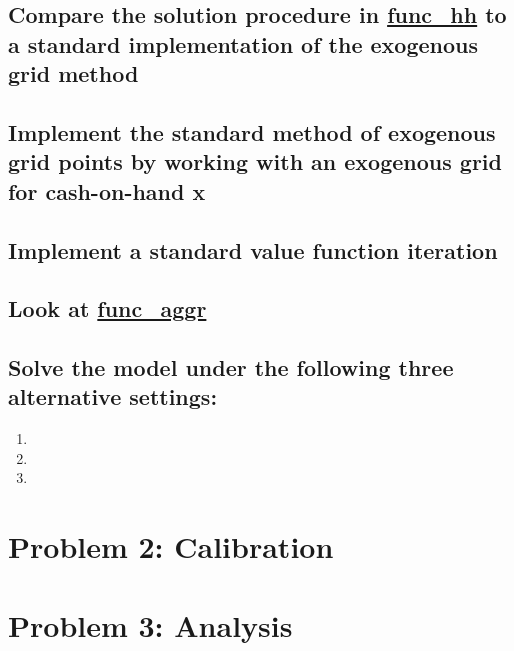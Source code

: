 \documentclass[12pt,a4paper]{article}
\newcommand\purl[1]{\protect\url{#1}} %
\begin{document}
\subsection*{Compare the solution procedure in \purl{func_hh} to a standard implementation of the exogenous grid method}

\subsection*{Implement the standard method of exogenous grid points by working with an exogenous grid for cash-on-hand x}

\subsection*{Implement a standard value function iteration}

\subsection*{Look at \purl{func_aggr}}

\subsection*{Solve the model under the following three alternative settings:}

\begin{enumerate}
\item
\item
\item
\end{enumerate}

\section*{Problem 2: Calibration}

\section*{Problem 3: Analysis}
\end{document}

